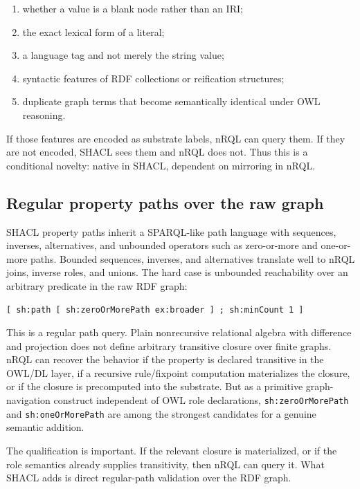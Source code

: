 \documentclass[11pt,letterpaper]{article}
\newcommand{\nrql}{nRQL}
\newcommand{\shacl}{SHACL}
\newcommand{\rdf}{RDF}
\newcommand{\owl}{OWL}
\begin{document}
\begin{enumerate}[leftmargin=2em]
  \item whether a value is a blank node rather than an IRI;
  \item the exact lexical form of a literal;
  \item a language tag and not merely the string value;
  \item syntactic features of \rdf{} collections or reification structures;
  \item duplicate graph terms that become semantically identical under \owl{} reasoning.
\end{enumerate}

If those features are encoded as substrate labels, \nrql{} can query them. If they are not encoded, \shacl{} sees them and \nrql{} does not. Thus this is a conditional novelty: native in \shacl{}, dependent on mirroring in \nrql{}.

\subsection{Regular property paths over the raw graph}

\shacl{} property paths inherit a SPARQL-like path language with sequences, inverses, alternatives, and unbounded operators such as zero-or-more and one-or-more paths. Bounded sequences, inverses, and alternatives translate well to \nrql{} joins, inverse roles, and unions. The hard case is unbounded reachability over an arbitrary predicate in the raw \rdf{} graph:

\begin{lstlisting}[language=turtle]
[ sh:path [ sh:zeroOrMorePath ex:broader ] ; sh:minCount 1 ]
\end{lstlisting}

This is a regular path query. Plain nonrecursive relational algebra with difference and projection does not define arbitrary transitive closure over finite graphs. \nrql{} can recover the behavior if the property is declared transitive in the \owl{}/DL layer, if a recursive rule/fixpoint computation materializes the closure, or if the closure is precomputed into the substrate. But as a primitive graph-navigation construct independent of \owl{} role declarations, \texttt{sh:zeroOrMorePath} and \texttt{sh:oneOrMorePath} are among the strongest candidates for a genuine semantic addition.

The qualification is important. If the relevant closure is materialized, or if the role semantics already supplies transitivity, then \nrql{} can query it. What \shacl{} adds is direct regular-path validation over the \rdf{} graph.
\end{document}

